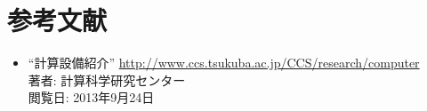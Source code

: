 \section{参考文献}
\begin{itemize}
	\item ``計算設備紹介'' \url{http://www.ccs.tsukuba.ac.jp/CCS/research/computer}	\\
		著者: 計算科学研究センター	\\
		閲覧日: 2013年9月24日
\end{itemize}



